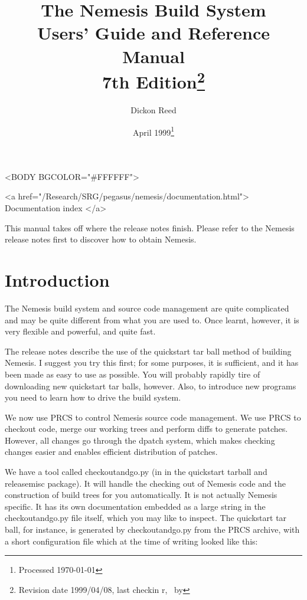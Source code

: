 \documentclass[a4paper]{article}
\title{The Nemesis Build System\\
  Users' Guide and Reference Manual\\
  7th Edition\thanks{Revision date 1999/04/08, last checkin
    r\checkinversion, \checkindate\ by \checkinauthor}}
\date{April 1999\thanks{Processed \today}}
\author{Dickon Reed}
\newcommand{\dir}   {\begingroup \urlstyle{tt}\Url}
\begin{document}
\begin{rawhtml}
<BODY BGCOLOR="#FFFFFF">
\end{rawhtml}
\begin{rawhtml}
<a href="/Research/SRG/pegasus/nemesis/documentation.html">
Documentation index </a>
\end{rawhtml}
\maketitle
\tableofcontents

This manual takes off where the release notes finish. Please refer to
the Nemesis release notes first to discover how to obtain Nemesis.

\section{Introduction}

The Nemesis build system and source code management are quite
complicated and may be quite different from what you are used to. Once
learnt, however, it is very flexible and powerful, and quite fast.

The release notes describe the use of the quickstart tar ball method
of building Nemesis. I suggest you try this first; for some purposes,
it is sufficient, and it has been made as easy to use as
possible. You will probably rapidly tire of downloading new quickstart
tar balls, however. Also, to introduce new programs you need to learn
how to drive the build system.

We now use PRCS to control Nemesis source code management. We use PRCS
to checkout code, merge our working trees and perform diffs to
generate patches. However, all changes go through the dpatch system,
which makes checking changes easier and enables efficient distribution
of patches.

We have a tool called checkoutandgo.py (in \dir{misc/scripts} in the
quickstart tarball and releasemisc package). It will handle the checking
out of Nemesis code and the construction of build trees for you
automatically. It is not actually Nemesis specific. It has its own
documentation embedded as a large string in the checkoutandgo.py file
itself, which you may like to inspect. The quickstart tar ball, for
instance, is generated by checkoutandgo.py from the PRCS archive, with
a short configuration file which at the time of writing looked like
this:
\end{document}
